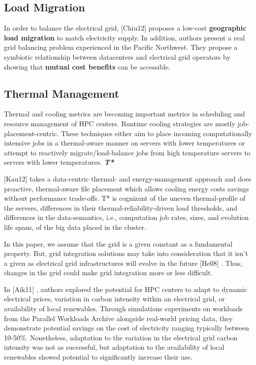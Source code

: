 \subsection{Load Migration}

In order to balance the electrical grid,
\cite{chiu_electric_2012}
[Chiu12] proposes a low-cost
\textbf{geographic load migration} to match electricity supply. In addition,
authors present a real grid balancing problem experienced in the Pacific
Northwest. They propose a symbiotic relationship between datacenters and
electrical grid operators by showing that \textbf{mutual cost benefits }can
be accessible.

\subsection{Thermal Management}
Thermal and cooling metrics are becoming important metrics in scheduling and
resource management of HPC centers. Runtime cooling strategies are mostly
job-placement-centric. These techniques either aim to place incoming
computationally intensive jobs in a thermal-aware manner on servers with
lower temperatures or attempt to reactively migrate/load-balance jobs from
high temperature servers to servers with lower temperatures.
\textbf{\textit{T* }} 

\cite{kaushik_t*:_2012}
[Kau12]
 takes a data-centric thermal- and
energy-management approach and does proactive, thermal-aware file placement
which allows cooling energy costs savings without performance trade-offs. T*
is cognizant of the uneven thermal-profile of the servers, differences in
their thermal-reliability-driven load thresholds, and differences in the
data-semantics, i.e., computation job rates, sizes, and evolution life
spans, of the big data placed in the cluster.

In this paper, we assume that the grid is a given constant as a fundamental
property. But, grid integration solutions may take into consideration that
it isn't a given as electrical grid infrastructures will evolve in the
future 
\cite{he_architecture_2008}
[He08]
. Thus, changes in the grid could make grid integration more or
less difficult.


In 
\cite{aikema_electrical_2011}
[Aik11] , authors explored the potential for HPC centers to adapt to
dynamic electrical prices, variation in carbon intensity within an
electrical grid, or availability of local renewables. Through simulations
experiments on workloads from the Parallel Workloads Archive alongside
real-world pricing data, they demonstrate potential savings on the cost of
electricity ranging typically between 10-50{\%}. Nonetheless, adaptation to
the variation in the electrical grid carbon intensity was not as successful,
but adaptation to the availability of local renewables showed potential to
significantly increase their use.
